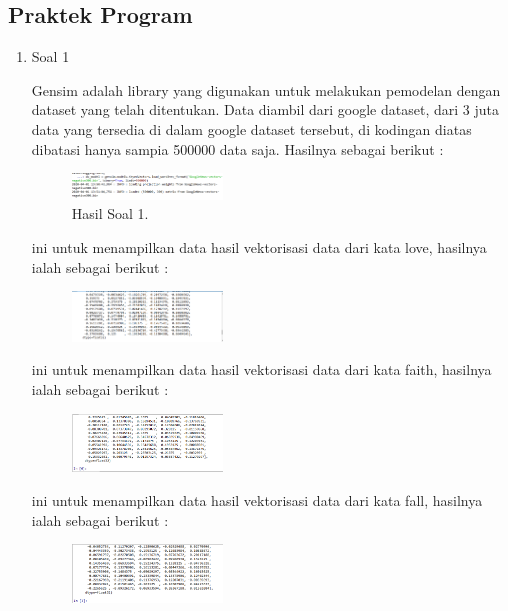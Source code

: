 \subsection{Praktek Program}
\begin{enumerate}
	\item Soal 1
	\hfill\break
	
	Gensim adalah library yang digunakan untuk melakukan pemodelan dengan dataset yang telah ditentukan. Data diambil dari google dataset, dari 3 juta data yang tersedia di dalam google dataset tersebut, di kodingan diatas dibatasi hanya sampia 500000 data saja. Hasilnya sebagai berikut : 
	\begin{figure}[H]
	\centering
		\includegraphics[width=4cm]{figures/1174095/tugas5/h1.PNG}
		\caption{Hasil Soal 1.}
	\end{figure}

	\hfill\break
	
	ini untuk menampilkan data hasil vektorisasi data dari kata love, hasilnya ialah sebagai berikut : 
	\begin{figure}[H]
	\centering
		\includegraphics[width=4cm]{figures/1174095/tugas5/h2.PNG}
	\end{figure}

	\hfill\break
	
	ini untuk menampilkan data hasil vektorisasi data dari kata faith, hasilnya ialah sebagai berikut : 
	\begin{figure}[H]
	\centering
		\includegraphics[width=4cm]{figures/1174095/tugas5/h3.PNG}
	\end{figure}

	\hfill\break
	
	ini untuk menampilkan data hasil vektorisasi data dari kata fall, hasilnya ialah sebagai berikut : 
	\begin{figure}[H]
	\centering
		\includegraphics[width=4cm]{figures/1174095/tugas5/h4.PNG}
	\end{figure}


\end{enumerate}
